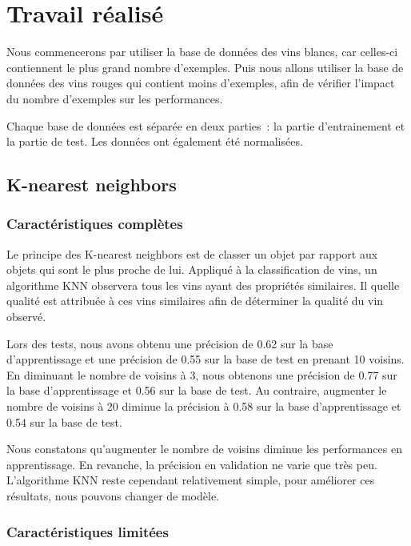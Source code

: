 \chapter{Travail réalisé}
\label{chap:realisation}

Nous commencerons par utiliser la base de données des vins blancs, car celles-ci contiennent le plus grand nombre d'exemples.
Puis nous allons utiliser la base de données des vins rouges qui contient moins d'exemples, afin de vérifier l'impact
du nombre d'exemples sur les performances.

Chaque base de données est séparée en deux parties~: la partie d'entrainement et la partie de test. Les données ont également
été normalisées.


\section{K-nearest neighbors}
\label{sec:knn}

\subsection*{Caractéristiques complètes}
\label{par:dataset-complet-knn}

Le principe des K-nearest neighbors est de classer un objet par rapport aux objets qui sont le plus proche de lui.
Appliqué à la classification de vins, un algorithme KNN observera tous les vins ayant des propriétés similaires. Il
quelle qualité est attribuée à ces vins similaires afin de déterminer la qualité du vin observé.

Lors des tests, nous avons obtenu une précision de 0.62 sur la base d'apprentissage et une précision de 0.55 sur la
base de test en prenant 10 voisins. En diminuant le nombre de voisins à 3, nous obtenons une précision de 0.77 sur la
base d'apprentissage et 0.56 sur la base de test. Au contraire, augmenter le nombre de voisins à 20 diminue la précision
à 0.58 sur la base d'apprentissage et 0.54 sur la base de test.

Nous constatons qu'augmenter le nombre de voisins diminue les performances en apprentissage. En revanche, la précision
en validation ne varie que très peu. L'algorithme KNN reste cependant relativement simple, pour améliorer ces résultats, nous pouvons changer de modèle.

\subsection*{Caractéristiques limitées}
\label{par:dataset-limit-knn}

